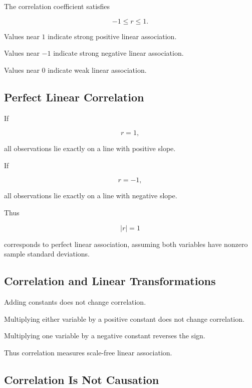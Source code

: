 The correlation coefficient satisfies

\[
\boxed{
-1\leq r\leq1.
}
\]

Values near \(1\) indicate strong positive linear association.

Values near \(-1\) indicate strong negative linear association.

Values near \(0\) indicate weak linear association.

\subsection{Perfect Linear Correlation}
\label{subsec:perfect-linear-correlation}

If

\[
r=1,
\]

all observations lie exactly on a line with positive slope.

If

\[
r=-1,
\]

all observations lie exactly on a line with negative slope.

Thus

\[
\boxed{
|r|=1
}
\]

corresponds to perfect linear association, assuming both variables have
nonzero sample standard deviations.

\subsection{Correlation and Linear Transformations}
\label{subsec:correlation-transformations}

Adding constants does not change correlation.

Multiplying either variable by a positive constant does not change
correlation.

Multiplying one variable by a negative constant reverses the sign.

Thus correlation measures scale-free linear association.

\subsection{Correlation Is Not Causation}
\label{subsec:correlation-not-causation}

